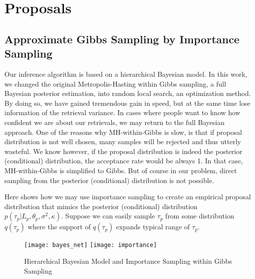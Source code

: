 \section{Proposals}
\subsection{Approximate Gibbs Sampling by Importance Sampling}
Our inference algorithm is based on a hierarchical Bayesian model. In this work, we changed the original Metropolis-Hasting within Gibbs sampling, a full Bayesian posterior estimation, into random local search, an optimization method. By doing so, we have gained tremendous gain in speed, but at the same time lose information of the retrieval variance. In cases where people want to know how confident we are about our retrievals, we may return to the full Bayesian approach. One of the reasons why MH-within-Gibbs is slow, is that if proposal distribution is not well chosen, many samples will be rejected and thus utterly wasteful. We know however, if the proposal distribution is indeed the posterior (conditional) distribution, the acceptance rate would be always 1. In that case, MH-within-Gibbs is simplified to Gibbs. But of course in our problem, direct sampling from the posterior (conditional) distribution is not possible.

Here shows how we may use importance sampling to create an empirical proposal distribution that mimics the posterior (conditional) distribution $p(\tau_p|L_p,\theta_p,\sigma^2,\kappa)$. Suppose we can easily sample $\tau_p$ from some distribution $q(\tau_p)$ where the support of $q(\tau_p)$ expands typical range of $\tau_p$.


\begin{figure}[h!]
    \centering
    \texttt{[image: bayes\_net]}
    \hfill
    \texttt{[image: importance]}
    \caption{Hierarchical Bayesian Model and Importance Sampling within Gibbs Sampling}
\end{figure}

